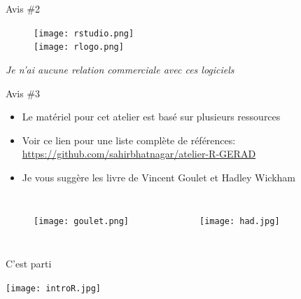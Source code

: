 \documentclass[11pt]{beamer}\usepackage[]{graphicx}\usepackage[]{color}
\begin{document}
\begin{frame}{Avis \#2}
\begin{figure}
\texttt{[image: rstudio.png]}\\[5mm]
\texttt{[image: rlogo.png]}\\[5mm]
\end{figure}

\textit{Je n'ai aucune relation commerciale avec ces logiciels}

\end{frame}

\begin{frame}{Avis \#3}

\begin{itemize}
\item Le mat\'{e}riel pour cet atelier est bas\'{e} sur plusieurs ressources
\item Voir ce lien pour une liste compl\`{e}te de r\'{e}f\'{e}rences: \href{https://github.com/sahirbhatnagar/atelier-R-GERAD}{https://github.com/sahirbhatnagar/atelier-R-GERAD}
\item Je vous sugg\`{e}re les livre de Vincent Goulet et Hadley Wickham
\end{itemize}

\begin{columns}[c] %
\begin{figure}
\texttt{[image: goulet.png]}
\end{figure}

\begin{figure}
\texttt{[image: had.jpg]}
\end{figure}
\end{columns}

\end{frame}


\begin{frame}[plain]{C'est parti}
\hspace*{-1.5cm}\parbox[t]{\textwidth}{
\begin{center}
\texttt{[image: introR.jpg]}
\end{center}
}
\end{frame}
\end{document}

